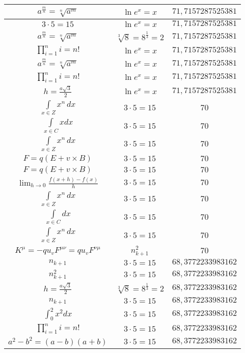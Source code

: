 \documentclass{article}
\begin{document}
\begin{flushleft}
\begin{longtable}{|c|c|c|}
$a^{\frac{m}{n}}=\sqrt[n]{a^{m}}$ & $\ln e^x=x$ & $71,7157287525381$ \\ \hline 
$3\cdot 5=15$ & $\ln e^x=x$ & $71,7157287525381$ \\ \hline 
$a^{\frac{m}{n}}=\sqrt[n]{a^{m}}$ & $\sqrt[3]{8}=8^{\frac{1}{3}}=2$ & $71,7157287525381$ \\ \hline 
$\prod_{i=1}^ni=n!$ & $\ln e^x=x$ & $71,7157287525381$ \\ \hline 
$a^{\frac{m}{n}}=\sqrt[n]{a^{m}}$ & $\ln e^x=x$ & $71,7157287525381$ \\ \hline 
$\prod_{i=1}^ni=n!$ & $\ln e^x=x$ & $71,7157287525381$ \\ \hline 
$h=\frac{a\sqrt{3}}{2}$ & $\ln e^x=x$ & $71,7157287525381$ \\ \hline 
$\int \limits_{x\in Z}\!x^{n}\,dx$ & $3\cdot 5=15$ & $70$ \\ \hline 
$\int \limits_{x\in C}xdx$ & $3\cdot 5=15$ & $70$ \\ \hline 
$\int \limits_{x\in Z}\!x^{n}\,dx$ & $3\cdot 5=15$ & $70$ \\ \hline 
$F=q\left(E+v\times B\right)$ & $3\cdot 5=15$ & $70$ \\ \hline 
$F=q\left(E+v\times B\right)$ & $3\cdot 5=15$ & $70$ \\ \hline 
$\lim_{h\to0}\frac{f(x+h)-f(x)}{h}$ & $3\cdot 5=15$ & $70$ \\ \hline 
$\int \limits_{x\in Z}\!x^{n}\,dx$ & $3\cdot 5=15$ & $70$ \\ \hline 
$\int \limits_{x\in C}dx$ & $3\cdot 5=15$ & $70$ \\ \hline 
$\int \limits_{x\in Z}\!x^{n}\,dx$ & $3\cdot 5=15$ & $70$ \\ \hline 
$K^\mu=-qu_vF^{\mu\nu}=qu_vF^{\nu\mu}$ & $n_{k+1}^2$ & $70$ \\ \hline 
$n_{k+1}$ & $3\cdot 5=15$ & $68,3772233983162$ \\ \hline 
$n_{k+1}^2$ & $3\cdot 5=15$ & $68,3772233983162$ \\ \hline 
$h=\frac{a\sqrt{3}}{2}$ & $\sqrt[3]{8}=8^{\frac{1}{3}}=2$ & $68,3772233983162$ \\ \hline 
$n_{k+1}$ & $3\cdot 5=15$ & $68,3772233983162$ \\ \hline 
$\int _0^2x^2dx$ & $3\cdot 5=15$ & $68,3772233983162$ \\ \hline 
$\prod_{i=1}^ni=n!$ & $3\cdot 5=15$ & $68,3772233983162$ \\ \hline 
$a^2-b^2=(a-b)(a+b)$ & $3\cdot 5=15$ & $68,3772233983162$ \\ \hline 

\end{longtable}
\end{flushleft}
\end{document}
